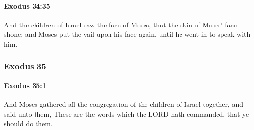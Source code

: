 		\paragraph{Exodus 34:35} %
			\label{EXODUS-34-35}

			And the children of Israel saw the face of Moses, that the skin of Moses' face shone: and Moses put the vail upon his face again, until he went in to speak with him.

	\subsubsection{Exodus 35} %
		\label{EXODUS-35}

		\paragraph{Exodus 35:1} %
			\label{EXODUS-35-1}

			And Moses gathered all the congregation of the children of Israel together, and said unto them, These are the words which the LORD hath commanded, that ye should do them.


